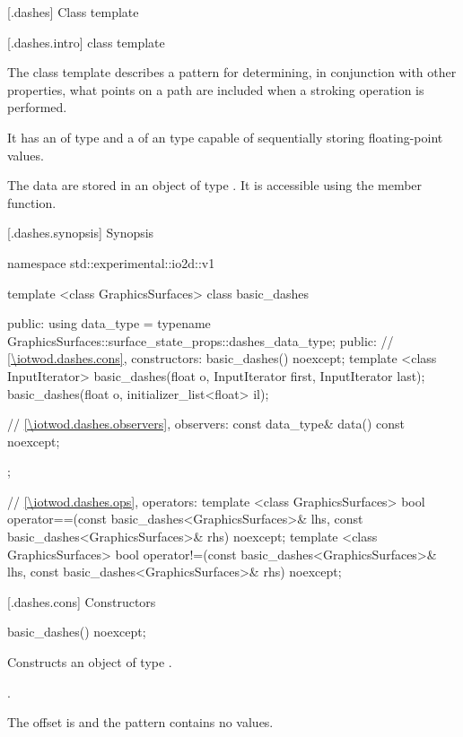 
 [\iotwod.dashes] {Class template }

 [\iotwod.dashes.intro] { class template}

\pnum
{}%
The class template  describes a pattern for determining, in conjunction with other properties, what points on a path are included when a stroking operation is performed.

\pnum
It has an  of type  and a  of an \unspec type capable of sequentially storing floating-point values.

\pnum
The data are stored in an object of type . It is accessible using the  member function.

 [\iotwod.dashes.synopsis] {Synopsis}

\begin{codeblock}
namespace std::experimental::io2d::v1 {
  template <class GraphicsSurfaces>
  class basic_dashes {
  public:
  using data_type = 
    typename GraphicsSurfaces::surface_state_props::dashes_data_type;
  public:
    // \ref{\iotwod.dashes.cons}, constructors:
    basic_dashes() noexcept;
    template <class InputIterator>
    basic_dashes(float o, InputIterator first, InputIterator last);
    basic_dashes(float o, initializer_list<float> il);

    // \ref{\iotwod.dashes.observers}, observers:
    const data_type& data() const noexcept;
  };

  // \ref{\iotwod.dashes.ops}, operators:
  template <class GraphicsSurfaces>
  bool operator==(const basic_dashes<GraphicsSurfaces>& lhs,
    const basic_dashes<GraphicsSurfaces>& rhs) noexcept;
  template <class GraphicsSurfaces>
  bool operator!=(const basic_dashes<GraphicsSurfaces>& lhs,
    const basic_dashes<GraphicsSurfaces>& rhs) noexcept;
}
\end{codeblock}

 [\iotwod.dashes.cons] {Constructors}

%
\begin{itemdecl}
basic_dashes() noexcept;
\end{itemdecl}
\begin{itemdescr}
\pnum
\effects
Constructs an object of type .

\pnum
\postconditions
{}.

\pnum
\remarks
The offset is  and the pattern contains no values.
\end{itemdescr}

